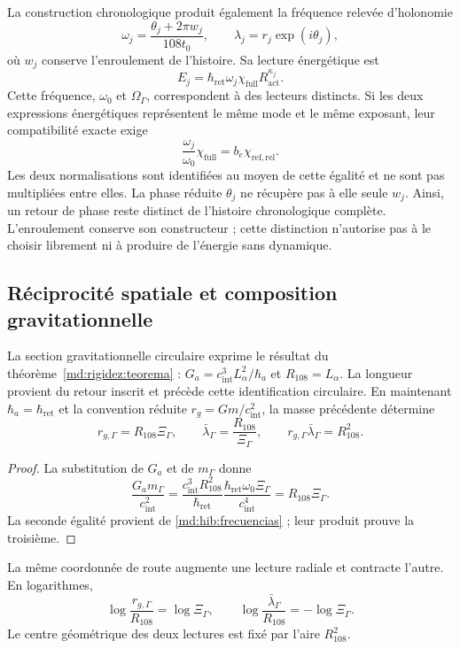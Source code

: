 La construction chronologique produit également la fréquence relevée
d’holonomie
\begin{equation}
 \omega_j=\frac{\theta_j+2\pi w_j}{108t_0},\qquad
 \lambda_j=r_j\exp(i\theta_j),
 \label{md:hib:frecuencia-levantada}
\end{equation}
où $w_j$ conserve l’enroulement de l’histoire. Sa lecture énergétique est
\begin{equation}
 E_j=\hbar_{\mathrm{ret}}\omega_j
 \chi_{\mathrm{full}}R_{\mathrm{act}}^{\kappa_j}.
 \label{md:hib:energia-levantada}
\end{equation}
Cette fréquence, $\omega_0$ et $\Omega_\Gamma$, correspondent à des lecteurs
distincts. Si les deux expressions énergétiques représentent le même mode et
le même exposant, leur compatibilité exacte exige
\begin{equation}
 \frac{\omega_j}{\omega_0}\chi_{\mathrm{full}}
 =b_e\chi_{\mathrm{ref,rel}}.
 \label{md:hib:compatibilidad-normalizaciones}
\end{equation}
Les deux normalisations sont identifiées au moyen de cette égalité et ne sont pas
multipliées entre elles. La phase réduite $\theta_j$ ne récupère pas à elle seule
$w_j$. Ainsi, un retour de phase reste distinct de l’histoire
chronologique complète. L’enroulement conserve son constructeur ; cette distinction
n’autorise pas à le choisir librement ni à produire de l’énergie sans dynamique.

\subsection{Réciprocité spatiale et composition gravitationnelle}
\label{md:hib:gravedad}

La section gravitationnelle circulaire exprime le résultat du
théorème~\ref{md:rigidez:teorema} :
$G_a=c_{\mathrm{int}}^3L_\alpha^2/\hbar_a$ et $R_{108}=L_\alpha$.
La longueur provient du retour inscrit et précède cette
identification circulaire. En maintenant
$\hbar_a=\hbar_{\mathrm{ret}}$ et la convention réduite
$r_g=Gm/c_{\mathrm{int}}^2$, la masse précédente détermine
\begin{equation}
 \boxed{r_{g,\Gamma}=R_{108}\Xi_\Gamma,\qquad
 \bar\lambda_\Gamma=\frac{R_{108}}{\Xi_\Gamma},\qquad
 r_{g,\Gamma}\bar\lambda_\Gamma=R_{108}^2.}
 \label{md:hib:reciprocidad-radial}
\end{equation}
\begin{proof}
La substitution de $G_a$ et de $m_\Gamma$ donne
\[
 \frac{G_am_\Gamma}{c_{\mathrm{int}}^2}
 =\frac{c_{\mathrm{int}}^3R_{108}^2}{\hbar_{\mathrm{ret}}}
 \frac{\hbar_{\mathrm{ret}}\omega_0\Xi_\Gamma}
 {c_{\mathrm{int}}^4}
 =R_{108}\Xi_\Gamma.
\]
La seconde égalité provient de \eqref{md:hib:frecuencias} ; leur produit
prouve la troisième.
\end{proof}
La même coordonnée de route augmente une lecture radiale et contracte l’autre.
En logarithmes,
\begin{equation}
 \log\frac{r_{g,\Gamma}}{R_{108}}=\log\Xi_\Gamma,
 \qquad
 \log\frac{\bar\lambda_\Gamma}{R_{108}}=-\log\Xi_\Gamma.
 \label{md:hib:radios-logaritmicos}
\end{equation}
Le centre géométrique des deux lectures est fixé par l’aire $R_{108}^2$.


